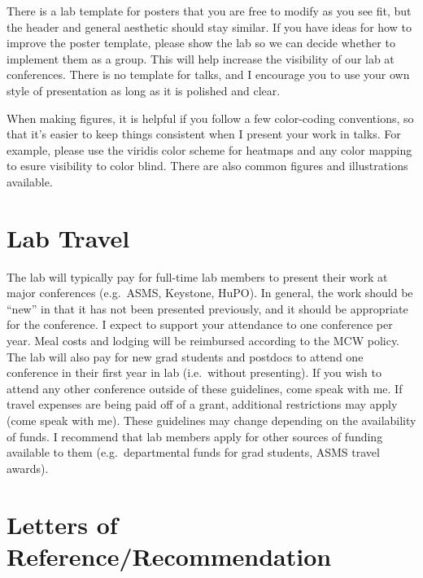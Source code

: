 \documentclass[
]{book}
\begin{document}
There is a lab template for posters that you are free to modify as you see fit, but the header and general aesthetic should stay similar. If you have ideas for how to improve the poster template, please show the lab so we can decide whether to implement them as a group. This will help increase the visibility of our lab at conferences. There is no template for talks, and I encourage you to use your own style of presentation as long as it is polished and clear.

When making figures, it is helpful if you follow a few color-coding conventions, so that it's easier to keep things consistent when I present your work in talks. For example, please use the viridis color scheme for heatmaps and any color mapping to esure visibility to color blind. There are also common figures and illustrations available.

\hypertarget{lab-travel}{%
\section{Lab Travel}\label{lab-travel}}

The lab will typically pay for full-time lab members to present their work at major conferences (e.g.~ASMS, Keystone, HuPO). In general, the work should be ``new'' in that it has not been presented previously, and it should be appropriate for the conference. I expect to support your attendance to one conference per year. Meal costs and lodging will be reimbursed according to the MCW policy. The lab will also pay for new grad students and postdocs to attend one conference in their first year in lab (i.e.~without presenting). If you wish to attend any other conference outside of these guidelines, come speak with me. If travel expenses are being paid off of a grant, additional restrictions may apply (come speak with me). These guidelines may change depending on the availability of funds. I recommend that lab members apply for other sources of funding available to them (e.g.~departmental funds for grad students, ASMS travel awards).

\hypertarget{letters-of-referencerecommendation}{%
\section{Letters of Reference/Recommendation}\label{letters-of-referencerecommendation}}
\end{document}
